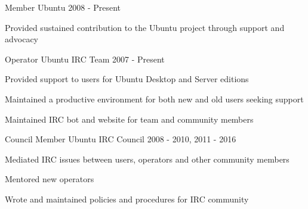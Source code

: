 

\begin{cventries}

  \cventry
    {Member} %
    {Ubuntu} %
    {2008 - Present} %
    {}
    {
      \begin{cvitems} %
        \item {Provided sustained contribution to the Ubuntu project through support and advocacy}
      \end{cvitems}
    }

\cventry
  {Operator} %
  {Ubuntu IRC Team} %
  {2007 - Present} %
  {}
  {
    \begin{cvitems} %
      \item {Provided support to users for Ubuntu Desktop and Server editions}
      \item {Maintained a productive environment for both new and old users seeking support}
      \item {Maintained IRC bot and website for team and community members}
    \end{cvitems}
  }

\cventry
{Council Member} %
{Ubuntu IRC Council} %
{2008 - 2010, 2011 - 2016} %
{}
{
  \begin{cvitems} %
    \item {Mediated IRC issues between users, operators and other community members}
    \item {Mentored new operators}
    \item {Wrote and maintained policies and procedures for IRC community}
  \end{cvitems}
}

\end{cventries}

